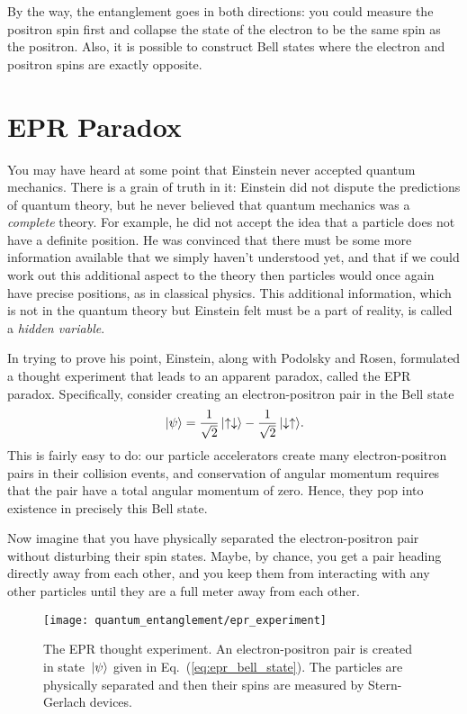 By the way, the entanglement goes in both directions: you could
measure the positron spin first and collapse the state of the electron
to be the same spin as the positron.  Also, it is possible to construct
Bell states where the electron and positron spins are exactly opposite.

\section{EPR Paradox}

\label{sec:epr_paradox}

You may have heard at some point that Einstein never accepted quantum
mechanics.  There is a grain of truth in it: Einstein did not dispute
the predictions of quantum theory, but he never believed that quantum
mechanics was a \textit{complete} theory.  For example, he did not
accept the idea that a particle does not have a definite position.  He
was convinced that there must be some more information available that
we simply haven't understood yet, and that if we could work out this
additional aspect to the theory then particles would once again have
precise positions, as in classical physics.  This additional
information, which is not in the quantum theory but Einstein felt must
be a part of reality, is called a \textit{hidden variable}.

In trying to prove his point, Einstein, along with Podolsky and Rosen,
formulated a thought experiment that leads to an apparent
paradox, called the EPR paradox.  
Specifically, consider creating an electron-positron pair in the
Bell state
\begin{equation}
 \,|\mbox{$\psi$}\rangle = \frac{1}{\sqrt{2}}\,|\mbox{$\uparrow\downarrow$}\rangle
 - \frac{1}{\sqrt{2}}\,|\mbox{$\downarrow\uparrow$}\rangle.
\label{eq:epr_bell_state}
\end{equation}
This is fairly easy to do: our particle accelerators create
many electron-positron pairs in their collision events, and conservation
of angular momentum requires that the pair have a total angular momentum
of zero.  Hence, they pop into existence in precisely this Bell state.

Now imagine that you have physically separated the electron-positron
pair without disturbing their spin states.  Maybe, by chance, you get
a pair heading directly away from each other, and you keep them from
interacting with any other particles until they are a full meter away
from each other.

\begin{figure}[h]
\begin{center}
\texttt{[image: quantum\_entanglement/epr\_experiment]}
\caption{The EPR thought experiment.  An electron-positron pair is
created in state $\,|\mbox{$\psi$}\rangle$ given in Eq.~(\ref{eq:epr_bell_state}).
The particles are physically separated and then their spins are measured by
Stern-Gerlach devices.}
\label{fig:epr_experiment}
\end{center}
\end{figure}

